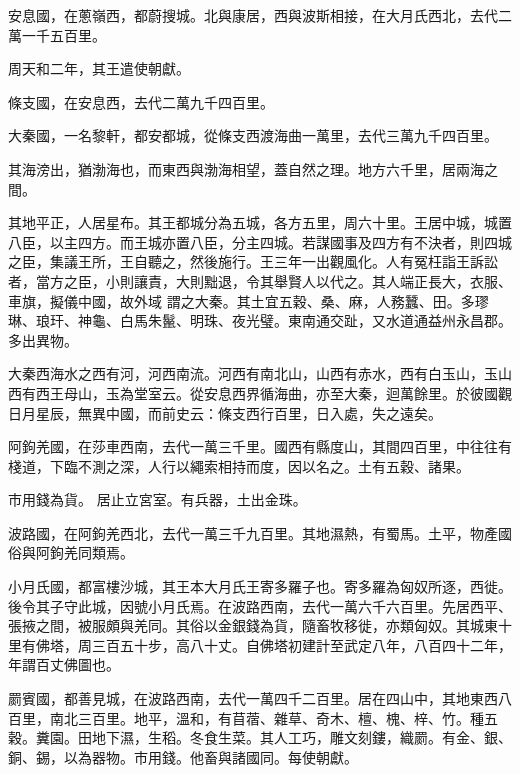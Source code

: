 \begin{pinyinscope}
 安息國，在蔥嶺西，都蔚搜城。北與康居，西與波斯相接，在大月氏西北，去代二萬一千五百里。



 周天和二年，其王遣使朝獻。



 條支國，在安息西，去代二萬九千四百里。



 大秦國，一名黎軒，都安都城，從條支西渡海曲一萬里，去代三萬九千四百里。



 其海滂出，猶渤海也，而東西與渤海相望，蓋自然之理。地方六千里，居兩海之間。



 其地平正，人居星布。其王都城分為五城，各方五里，周六十里。王居中城，城置八臣，以主四方。而王城亦置八臣，分主四城。若謀國事及四方有不決者，則四城之臣，集議王所，王自聽之，然後施行。王三年一出觀風化。人有冤枉詣王訴訟者，當方之臣，小則讓責，大則黜退，令其舉賢人以代之。其人端正長大，衣服、車旗，擬儀中國，故外域
 謂之大秦。其土宜五穀、桑、麻，人務蠶、田。多璆琳、琅玕、神龜、白馬朱鬣、明珠、夜光璧。東南通交趾，又水道通益州永昌郡。多出異物。



 大秦西海水之西有河，河西南流。河西有南北山，山西有赤水，西有白玉山，玉山西有西王母山，玉為堂室云。從安息西界循海曲，亦至大秦，迴萬餘里。於彼國觀日月星辰，無異中國，而前史云：條支西行百里，日入處，失之遠矣。



 阿鉤羌國，在莎車西南，去代一萬三千里。國西有縣度山，其間四百里，中往往有棧道，下臨不測之深，人行以繩索相持而度，因以名之。土有五穀、諸果。



 市用錢為貨。
 居止立宮室。有兵器，土出金珠。



 波路國，在阿鉤羌西北，去代一萬三千九百里。其地濕熱，有蜀馬。土平，物產國俗與阿鉤羌同類焉。



 小月氏國，都富樓沙城，其王本大月氏王寄多羅子也。寄多羅為匈奴所逐，西徙。後令其子守此城，因號小月氏焉。在波路西南，去代一萬六千六百里。先居西平、張掖之間，被服頗與羌同。其俗以金銀錢為貨，隨畜牧移徙，亦類匈奴。其城東十里有佛塔，周三百五十步，高八十丈。自佛塔初建計至武定八年，八百四十二年，年謂百丈佛圖也。



 罽賓國，都善見城，在波路西南，去代一萬四千二百里。居在四山中，其地東西八百里，南北三百里。地平，溫和，有苜蓿、雜草、奇木、檀、槐、梓、竹。種五穀。糞園。田地下濕，生稻。冬食生菜。其人工巧，雕文刻鏤，織罽。有金、銀、銅、錫，以為器物。市用錢。他畜與諸國同。每使朝獻。




\end{pinyinscope}
